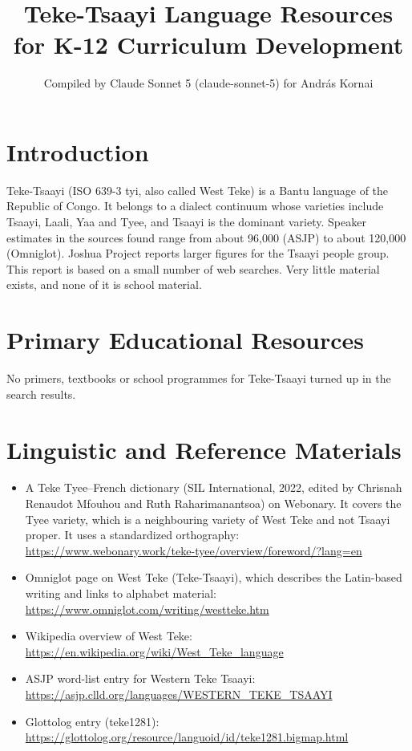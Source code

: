 \documentclass[12pt]{article}
\title{Teke-Tsaayi Language Resources for K-12 Curriculum Development}
\author{Compiled by Claude Sonnet 5 (claude-sonnet-5) for Andr\'as Kornai}
\date{}
\begin{document}
\maketitle

\section{Introduction}
Teke-Tsaayi (ISO 639-3 tyi, also called West Teke) is a Bantu language of the Republic of Congo. It belongs to a dialect continuum whose varieties include Tsaayi, Laali, Yaa and Tyee, and Tsaayi is the dominant variety. Speaker estimates in the sources found range from about 96,000 (ASJP) to about 120,000 (Omniglot). Joshua Project reports larger figures for the Tsaayi people group. This report is based on a small number of web searches. Very little material exists, and none of it is school material.

\section{Primary Educational Resources}
No primers, textbooks or school programmes for Teke-Tsaayi turned up in the search results.

\section{Linguistic and Reference Materials}
\begin{itemize}
\item A Teke Tyee--French dictionary (SIL International, 2022, edited by Chrisnah Renaudot Mfouhou and Ruth Raharimanantsoa) on Webonary. It covers the Tyee variety, which is a neighbouring variety of West Teke and not Tsaayi proper. It uses a standardized orthography: \url{https://www.webonary.work/teke-tyee/overview/foreword/?lang=en}
\item Omniglot page on West Teke (Teke-Tsaayi), which describes the Latin-based writing and links to alphabet material: \url{https://www.omniglot.com/writing/westteke.htm}
\item Wikipedia overview of West Teke: \url{https://en.wikipedia.org/wiki/West_Teke_language}
\item ASJP word-list entry for Western Teke Tsaayi: \url{https://asjp.clld.org/languages/WESTERN_TEKE_TSAAYI}
\item Glottolog entry (teke1281): \url{https://glottolog.org/resource/languoid/id/teke1281.bigmap.html}
\end{itemize}
\end{document}
